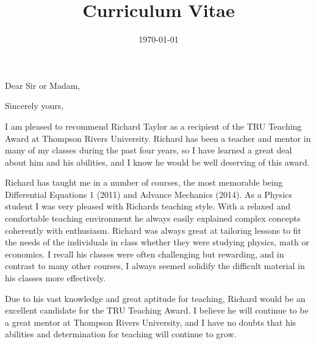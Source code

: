 \documentclass[12pt,a4paper]{moderncv} %
\title{Curriculum Vitae}
\begin{document}


\clearpage

\date{\today} %
\opening{Dear Sir or Madam,} %
\closing{Sincerely yours,} %


\makelettertitle %

I am pleased to recommend Richard Taylor as a recipient of the TRU Teaching Award at Thompson Rivers University. Richard has been a teacher and mentor in many of my classes during the past four years, so I have learned a great deal about him and his abilities, and I know he would be well deserving of this award.

Richard has taught me in a number of courses, the most memorable being Differential Equations 1 (2011) and Advance Mechanics (2014). As a Physics student I was very pleased with Richards teaching style. With a relaxed and comfortable teaching environment he always easily explained complex concepts coherently with enthusiasm. Richard was always great at tailoring lessons to fit the needs of the individuals in class whether they were studying physics, math or economics. I recall his classes were often challenging but rewarding, and in contrast to many other courses, I always seemed solidify the difficult material in his classes more effectively.  

Due to his vast knowledge and great aptitude for teaching, Richard would be an excellent candidate for the TRU Teaching Award. I believe he will continue to be a great mentor at Thompson Rivers University, and I have no doubts that his abilities and determination for teaching will continue to grow. 

 \makeletterclosing


\end{document}
